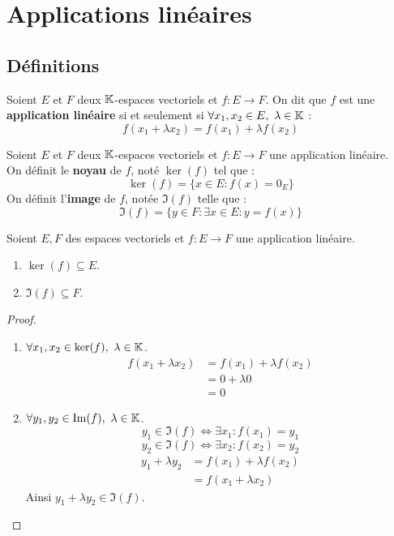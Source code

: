 \chapter{Applications linéaires}
\def\arraystretch{1}

\section{Définitions}
\begin{definition}
    Soient $E$ et $F$ deux $\mathbb{K}$-espaces vectoriels et $f : E \to F$.
    On dit que $f$ est une \textbf{application linéaire} si et seulement si $\forall x_1, x_2 \in E,\ \lambda \in \mathbb{K}$ :
    \[ f(x_1 + \lambda x_2) = f(x_1) + \lambda f(x_2) \]
\end{definition}

\begin{definition}
    Soient $E$ et $F$ deux $\mathbb{K}$-espaces vectoriels et $f : E \to F$ une application linéaire.
    \\
    On définit le \textbf{noyau} de $f$, noté $\ker(f)$ tel que :
    \[ \ker(f) = \{ x \in E : f(x) = 0_E \} \] 
    On définit l'\textbf{image} de $f$, notée $\Im(f)$ telle que :
    \[ \Im(f) = \{ y \in F : \exists x \in E : y = f(x) \} \]
\end{definition}

\begin{theorem}
	Soient $E, F$ des espaces vectoriels et $f : E \to F$ une application linéaire.
	\begin{enumerate}
		\item $\ker(f) \subseteq E$.
		\item $\Im(f) \subseteq F$.
	\end{enumerate}
\end{theorem}

\begin{proof}
	\leavevmode 
	\begin{enumerate}
		\item $\forall x_1, x_2 \in \ker(f),\ \lambda \in \mathbb{K}$.
		\begin{align*}
			f(x_1 + \lambda x_2) &= f(x_1) + \lambda f(x_2) \\ 
								 &= 0 + \lambda 0 \\
								 &= 0
		\end{align*}
		\item $\forall y_1, y_2 \in \Im(f),\ \lambda \in \mathbb{K}$.
		\[ y_1 \in \Im(f) \iff \exists x_1 : f(x_1) = y_1 \]
		\[ y_2 \in \Im(f) \iff \exists x_2 : f(x_2) = y_2 \]
		\begin{align*}
			y_1 + \lambda y_2 &= f(x_1) + \lambda f(x_2) \\
			                  &= f(x_1 + \lambda x_2)
		\end{align*}
		Ainsi $y_1 + \lambda y_2 \in \Im(f)$.
	\end{enumerate}
\end{proof}

